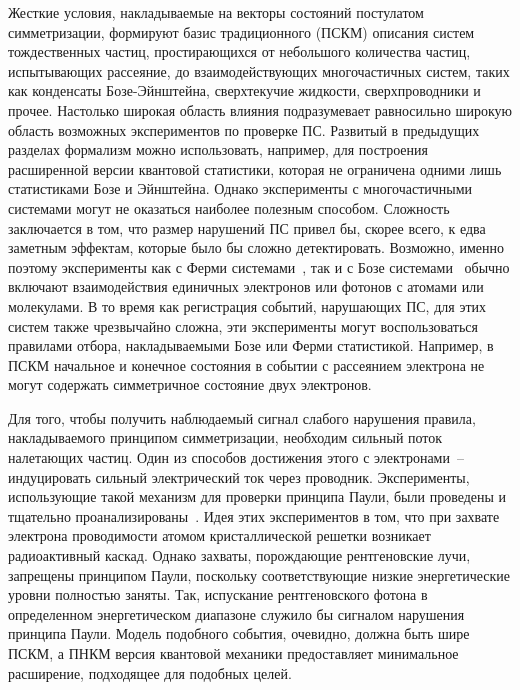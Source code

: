 \documentclass[a4paper, 12pt]{article}
\begin{document}


\label{sec:paper:5}

Жесткие условия, накладываемые на векторы состояний постулатом 
симметризации, формируют базис традиционного (ПСКМ) описания систем 
тождественных частиц, простирающихся от небольшого количества частиц, 
испытывающих рассеяние, до взаимодействующих многочастичных систем, 
таких как конденсаты Бозе-Эйнштейна, сверхтекучие жидкости, 
сверхпроводники и прочее. Настолько широкая область влияния 
подразумевает равносильно широкую область возможных экспериментов по 
проверке ПС.
%
Развитый в предыдущих разделах формализм можно использовать, например, 
для построения расширенной версии квантовой статистики, которая не 
ограничена одними лишь статистиками Бозе и Эйнштейна. Однако 
эксперименты с многочастичными системами могут не оказаться наиболее 
полезным способом. Сложность заключается в том, что размер нарушений ПС 
привел бы, скорее всего, к едва заметным эффектам, которые было бы 
сложно детектировать. Возможно, именно поэтому эксперименты как с Ферми 
системами~\cite{ref3, ref4, ref5, ref6, ref7}, %
так и с Бозе системами~\cite{ref8, ref9, ref10} %
обычно включают взаимодействия единичных электронов или фотонов 
с атомами или молекулами. В то время как регистрация событий, нарушающих 
ПС, для этих систем также чрезвычайно сложна, эти эксперименты могут 
воспользоваться правилами отбора, накладываемыми Бозе или Ферми 
статистикой. Например, в ПСКМ начальное и конечное состояния в событии 
с рассеянием электрона не могут содержать симметричное состояние двух 
электронов.

Для того, чтобы получить наблюдаемый сигнал слабого нарушения правила, 
накладываемого принципом симметризации, необходим сильный поток 
налетающих частиц. Один из способов достижения этого с электронами~-- 
индуцировать сильный электрический ток через проводник. Эксперименты, 
использующие такой механизм для проверки принципа Паули, были проведены 
и тщательно проанализированы~\cite{ref6}. %
Идея этих экспериментов в том, что при захвате электрона проводимости 
атомом кристаллической решетки возникает радиоактивный каскад. Однако 
захваты, порождающие рентгеновские лучи, запрещены принципом Паули, 
поскольку соответствующие низкие энергетические уровни полностью заняты. 
Так, испускание рентгеновского фотона в определенном энергетическом 
диапазоне служило бы сигналом нарушения принципа Паули. Модель подобного 
события, очевидно, должна быть шире ПСКМ, а ПНКМ версия квантовой 
механики предоставляет минимальное расширение, подходящее для подобных 
целей.
\end{document}

